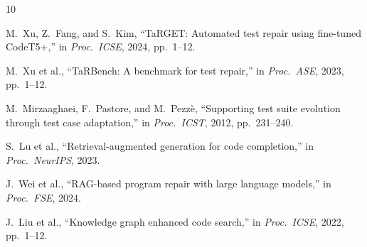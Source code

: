 \documentclass[conference,10pt]{IEEEtran}
\begin{document}
\begin{thebibliography}{10}

M.~Xu, Z.~Fang, and S.~Kim,
``TaRGET: Automated test repair using fine-tuned CodeT5+,''
in \emph{Proc.\ ICSE}, 2024, pp.~1--12.

M.~Xu et al.,
``TaRBench: A benchmark for test repair,''
in \emph{Proc.\ ASE}, 2023, pp.~1--12.

M.~Mirzaaghaei, F.~Pastore, and M.~Pezz\`{e},
``Supporting test suite evolution through test case adaptation,''
in \emph{Proc.\ ICST}, 2012, pp.~231--240.

S.~Lu et al.,
``Retrieval-augmented generation for code completion,''
in \emph{Proc.\ NeurIPS}, 2023.

J.~Wei et al.,
``RAG-based program repair with large language models,''
in \emph{Proc.\ FSE}, 2024.

J.~Liu et al.,
``Knowledge graph enhanced code search,''
in \emph{Proc.\ ICSE}, 2022, pp.~1--12.

\end{thebibliography}
\end{document}
